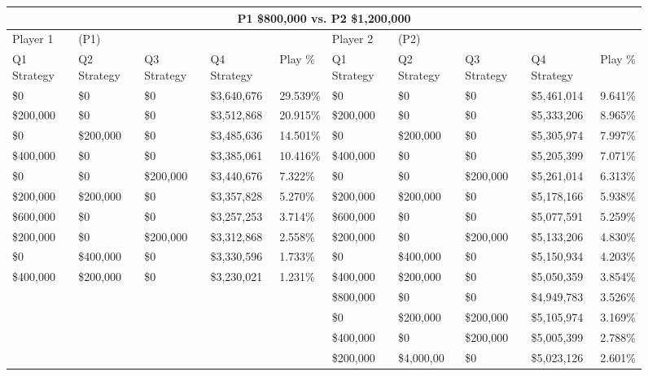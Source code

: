 \documentclass[11pt]{article}
\begin{document}
\begin{figure}
\tiny
\begin{tabular}{ |p{1.0cm}p{1.0cm}p{1.0cm}p{2.0cm}|p{1.0cm}||p{1.0cm}p{1.0cm}p{1.0cm}p{2.0cm}|p{1.0cm}|}
\hline
\multicolumn{10}{|c|}{P1 \$800,000 vs. P2 \$1,200,000} \\
\hline
Player 1 & (P1) & & & & Player 2 & (P2) & & & \\
\hline
Q1 Strategy & Q2 Strategy & Q3 Strategy & Q4 Strategy  &  Play \% & Q1 Strategy & Q2 Strategy & Q3 Strategy & Q4 Strategy  &  Play \%\\
\hline
\$0 & \$0 & \$0 & \$3,640,676 & 29.539\%                & \$0 & \$0 & \$0 & \$5,461,014 & 9.641\% \\
\$200,000 & \$0 & \$0 & \$3,512,868 & 20.915\%          & \$200,000 & \$0 & \$0 & \$5,333,206 & 8.965\% \\
\$0 & \$200,000 & \$0 & \$3,485,636 & 14.501\%          & \$0 & \$200,000 & \$0 & \$5,305,974 & 7.997\% \\
\$400,000 & \$0 & \$0 & \$3,385,061 & 10.416\%          & \$400,000 & \$0 & \$0 & \$5,205,399 & 7.071\% \\
\$0 & \$0 & \$200,000 & \$3,440,676 & 7.322\%           & \$0 & \$0 & \$200,000 & \$5,261,014 & 6.313\% \\
\$200,000 & \$200,000 & \$0 & \$3,357,828 & 5.270\%     & \$200,000 & \$200,000 & \$0 & \$5,178,166 & 5.938\% \\
\$600,000 & \$0 & \$0 & \$3,257,253 & 3.714\%           & \$600,000 & \$0 & \$0 & \$5,077,591 & 5.259\% \\
\$200,000 & \$0 & \$200,000 & \$3,312,868 & 2.558\%     & \$200,000 & \$0 & \$200,000 & \$5,133,206 & 4.830\% \\
\$0 & \$400,000 & \$0 & \$3,330,596 & 1.733\%           & \$0 & \$400,000 & \$0 & \$5,150,934 & 4.203\% \\
\$400,000 & \$200,000 & \$0 & \$3,230,021 & 1.231\%     & \$400,000 & \$200,000 & \$0 & \$5,050,359 & 3.854\% \\
& & & &                                                 & \$800,000 & \$0 & \$0 & \$4,949,783 & 3.526\% \\
& & & &                                                 & \$0 & \$200,000 & \$200,000 & \$5,105,974 & 3.169\% \\
& & & &                                                 & \$400,000 & \$0 & \$200,000 & \$5,005,399 & 2.788\% \\
& & & &                                                 & \$200,000 & \$4,000,00 & \$0 & \$5,023,126 & 2.601\% \\

\end{tabular}
\end{figure}
\end{document}

